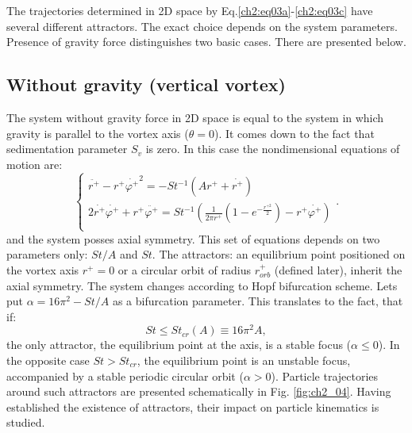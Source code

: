 \documentclass[../main.tex]{subfiles}
\begin{document}
The trajectories determined in 2D space by Eq.\ref{ch2:eq03a}-\ref{ch2:eq03c} have several different attractors. The exact choice depends on the system parameters. Presence of gravity force distinguishes two basic cases. There are presented below.

\subsection{Without gravity (vertical vortex)}
The system without gravity force in 2D space is equal to the system in which gravity is parallel to the vortex axis ($\theta=0$). It comes down to the fact that sedimentation parameter $S_v$ is zero. In this case the nondimensional equations of motion are:
\begin{equation}
\left\{\begin{array}{l}
\ddot{r^+}-r^+\dot{\varphi^+}^2=-St^{-1}\left(A r^++\dot{r^+}\right) \\
2\dot{r^+}\dot{\varphi^+}+r^+\ddot{\varphi^+}=St^{-1}\left(\frac{1}{2 \pi r^+}(1-e^{-\frac{r^{+ 2}}{2}})-r^+\dot{\varphi^+}\right)\\
\end{array}.\right.
\label{ch3:eq16}
\end{equation}
and the system posses axial symmetry. This set of equations depends on two parameters only: $St/A$ and $St$. The attractors: an equilibrium point positioned on the vortex axis $r^+=0$ or a circular orbit of radius $r^+_{orb}$ (defined later), inherit the axial symmetry. The system changes according to Hopf bifurcation scheme. Lets put $\alpha=16 \pi^2-St/A$ as a bifurcation parameter. This translates to the fact, that if:
\begin{equation}
St \leq St_{cr}(A) \equiv 16 \pi^2 A,
\label{ch3:eq17}
\end{equation}
the only attractor, the equilibrium point at the axis, is a stable focus ($\alpha \leq 0$). In the opposite case $St > St_{cr}$, the equilibrium point is an unstable focus, accompanied by a stable periodic circular orbit ($\alpha>0$). Particle trajectories around such attractors are presented schematically in Fig. \autoref{fig:ch2_04}. Having established the existence of attractors, their impact on particle kinematics is studied.\\
\end{document}
